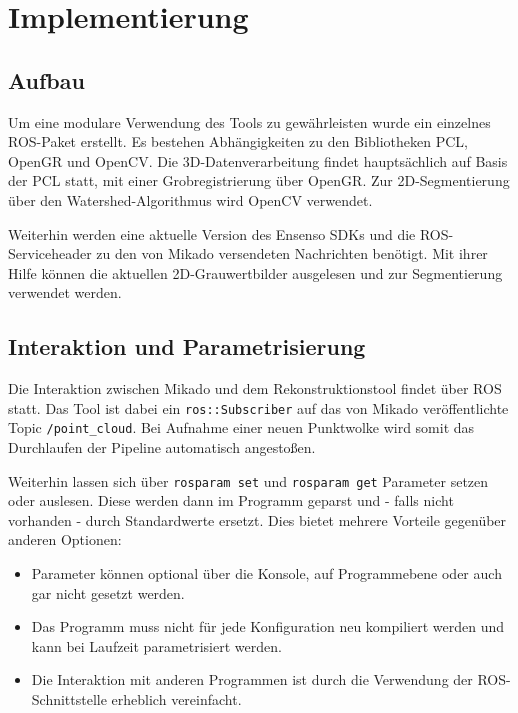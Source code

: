 
\chapter{Implementierung}
\label{ch:implementierung}


\section{Aufbau}
\label{sec:aufbau}

Um eine modulare Verwendung des Tools zu gewährleisten wurde ein einzelnes \ac{ROS}-Paket erstellt.
Es bestehen Abhängigkeiten zu den Bibliotheken \ac{PCL}, \ac{OpenGR} und OpenCV.
Die 3D-Datenverarbeitung findet hauptsächlich auf Basis der \ac{PCL} statt, mit einer Grobregistrierung über \ac{OpenGR}.
Zur 2D-Segmentierung über den Watershed-Algorithmus wird OpenCV verwendet.

Weiterhin werden eine aktuelle Version des Ensenso SDKs und die \ac{ROS}-Serviceheader zu den von Mikado versendeten Nachrichten benötigt.
Mit ihrer Hilfe können die aktuellen 2D-Grauwertbilder ausgelesen und zur Segmentierung verwendet werden.


\section{Interaktion und Parametrisierung}
\label{sec:interaktion}

Die Interaktion zwischen Mikado und dem Rekonstruktionstool findet über \ac{ROS} statt.
Das Tool ist dabei ein \texttt{ros::Subscriber} auf das von Mikado veröffentlichte Topic \texttt{/point\_cloud}.
Bei Aufnahme einer neuen Punktwolke wird somit das Durchlaufen der Pipeline automatisch angestoßen.

Weiterhin lassen sich über \texttt{rosparam set} und \texttt{rosparam get} Parameter setzen oder auslesen.
Diese werden dann im Programm geparst und - falls nicht vorhanden - durch Standardwerte ersetzt.
Dies bietet mehrere Vorteile gegenüber anderen Optionen:

\begin{itemize}
\item Parameter können optional über die Konsole, auf Programmebene oder auch gar nicht gesetzt werden.
\item Das Programm muss nicht für jede Konfiguration neu kompiliert werden und kann bei Laufzeit parametrisiert werden.
\item Die Interaktion mit anderen Programmen ist durch die Verwendung der \ac{ROS}-Schnittstelle erheblich vereinfacht.
\end{itemize}

